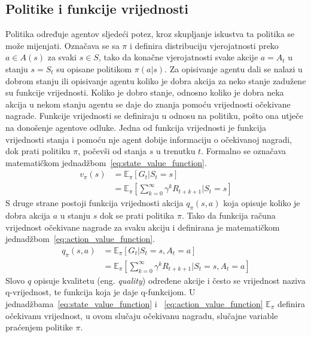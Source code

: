 \subsection{Politike i funkcije vrijednosti}
Politika određuje agentov sljedeći potez, kroz skupljanje iskustva ta politika se može mijenjati. Označava se sa $\pi$ i definira distribuciju vjerojatnosti preko $a \in A(s)$ za svaki $s \in S$, tako da konačne vjerojatnosti svake akcije $a = A_t$ u stanju $s = S_t$ su opisane politikom $\pi(a|s)$.
Za opisivanje agentu dali se nalazi u dobrom stanju ili opisivanje agentu koliko je dobra akcija za neko stanje zadužene su funkcije vrijednosti. Koliko je dobro stanje, odnosno koliko je dobra neka akcija u nekom stanju agentu se daje do znanja pomoću vrijednosti očekivane nagrade. Funkcije vrijednosti se definiraju u odnosu na politiku, pošto ona utječe na donošenje agentove odluke.
Jedna od funkcija vrijednosti je funkcija vrijednosti stanja i pomoću nje agent dobije informaciju o očekivanoj nagradi, dok prati politiku $\pi$, počevši od stanja $s$ u trenutku $t$. Formalno se označava matematičkom jednadžbom~\ref{eq:state_value_function}.
\begin{equation}\label{eq:state_value_function}
	\begin{split}
		v_\pi(s) &= \mathbb{E}_\pi[G_t | S_t = s] \\
				 &= \mathbb{E}_\pi\left[\sum_{k=0}^{\infty} \gamma^k R_{t+k+1} | S_t = s\right]
     \end{split}
\end{equation}
S druge strane postoji funkcija vrijednosti akcija $q_\pi(s, a)$ koja opisuje koliko je dobra akcija $a$ u stanju $s$ dok se prati politika $\pi$. Tako da funkcija računa vrijednost očekivane nagrade za svaku akciju i definirana je matematičkom jednadžbom~\ref{eq:action_value_function}.
\begin{equation}\label{eq:action_value_function}
\begin{split}
q_\pi(s, a) &= \mathbb{E}_\pi[G_t | S_t = s, A_t = a] \\
&= \mathbb{E}_\pi\left[\sum_{k=0}^{\infty} \gamma^k R_{t+k+1} | S_t = s, A_t = a\right]
\end{split}
\end{equation}
Slovo $q$ opisuje kvalitetu (eng. \textit{quality}) određene akcije i često se vrijednost naziva q-vrijednost, te funkcija koja je daje q-funkcijom. U jednadžbama~\ref{eq:state_value_function} i ~\ref{eq:action_value_function} $\mathbb{E}_\pi$ definira očekivanu vrijednost, u ovom slučaju očekivanu nagradu, slučajne variable praćenjem politike $\pi$.

